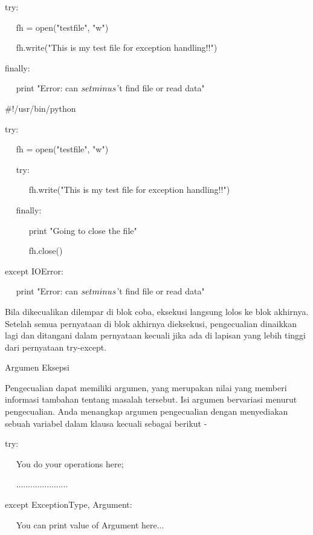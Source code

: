 try: \par
~~ fh = open("testfile", "w") \par
~~ fh.write("This is my test file for exception handling!!") \par
finally: \par
~~ print "Error: can $  \\setminus  $'t find file or read data" \par
\vspace{12pt}
\vspace{12pt}
 $  \#  $!/usr/bin/python \par
\vspace{12pt}
try: \par
~~ fh = open("testfile", "w") \par
~~ try: \par
~~~~~ fh.write("This is my test file for exception handling!!") \par
~~ finally: \par
~~~~~ print "Going to close the file" \par
~~~~~ fh.close() \par
except IOError: \par
~~ print "Error: can $  \\setminus  $'t find file or read data" \par
\vspace{12pt}
\vspace{12pt}
Bila dikecualikan dilempar di blok coba, eksekusi langsung lolos ke blok akhirnya. Setelah semua pernyataan di blok akhirnya dieksekusi, pengecualian dinaikkan lagi dan ditangani dalam pernyataan kecuali jika ada di lapisan yang lebih tinggi dari pernyataan try-except. \par
Argumen Eksepsi \par
\vspace{12pt}
Pengecualian dapat memiliki argumen, yang merupakan nilai yang memberi informasi tambahan tentang masalah tersebut. Isi argumen bervariasi menurut pengecualian. Anda menangkap argumen pengecualian dengan menyediakan sebuah variabel dalam klausa kecuali sebagai berikut - \par
\vspace{12pt}
try: \par
~~ You do your operations here; \par
~~ ...................... \par
except ExceptionType, Argument: \par
~~ You can print value of Argument here... \par

